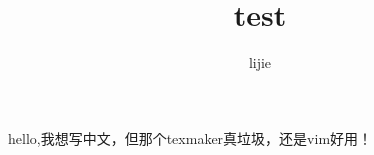 \documentclass[UTF8]{ctexart}
\author{lijie}
\title{test}
\begin{document}
\maketitle
hello,我想写中文，但那个texmaker真垃圾，还是vim好用！
\end{document}
